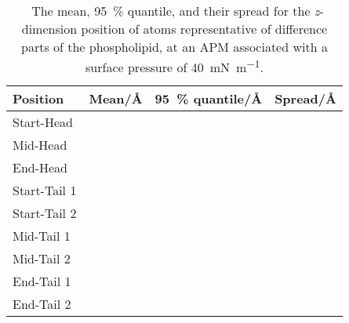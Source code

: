 %
%
\begin{table}
\centering
\small
  \caption{\ The mean, \SI{95}{\percent} quantile, and their spread for the \emph{z}-dimension position of atoms representative of difference parts of the phospholipid, at an APM associated with a surface pressure of \SI{40}{\milli\newton\per\meter}.}
  \label{tab:spread2}
  \begin{tabular}{llll}
    \toprule
    Position & Mean/\si{\angstrom} & \SI{95}{\percent} quantile/\si{\angstrom} & Spread/\si{\angstrom} \\
    \midrule
    Start-Head &  &  &  \\
    Mid-Head &  &  &  \\
    End-Head &  &  &  \\
    \midrule
    Start-Tail 1 &  &  &  \\
    Start-Tail 2 &  &  &  \\
    Mid-Tail 1 &  &  &  \\
    Mid-Tail 2 &  &  &  \\
    End-Tail 1 &  &  &  \\
    End-Tail 2 &  &  &  \\
    \bottomrule
  \end{tabular}
\end{table}

